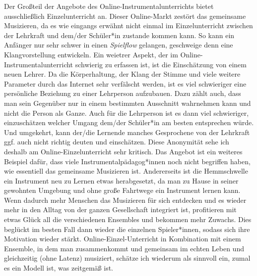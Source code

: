 Der Großteil der Angebote des Online-Instrumentalunterrichts bietet
ausschließlich Einzelunterricht an. Dieser Online-Markt zestört das gemeinsame
Musizieren, da es wie eingangs erwähnt nicht einmal im Einzelunterricht zwischen
der Lehrkraft und dem/der Schüler*in zustande kommen kann. So kann ein Anfänger
nur sehr schwer in einen \emph{Spielflow} gelangen, geschweige denn eine
Klangvorstellung entwickeln. Ein weietrer Aspekt, der im
Online-Instrumentalunterricht schwierig zu erfassen ist, ist die Einschätzung
von einem neuen Lehrer. Da die Körperhaltung, der Klang der Stimme und viele
weitere Parameter durch das Internet sehr verfälscht werden, ist es viel
schwieriger eine persönliche Beziehung zu einer Lehrperson aufzubauen. Dazu
zählt auch, dass man sein Gegenüber nur in einem bestimmten Ausschnitt
wahrnehmen kann und nicht die Person als Ganze. Auch für die Lehrperson ist es
dann viel schwieriger, einzuschätzen welcher Umgang dem/der Schüler*in am besten
entsprechen würde. Und umgekehrt, kann der/die Lernende manches Gesprochene von
der Lehrkraft ggf. auch nicht richtig deuten und einschätzen. Diese Anonymität
sehe ich deshalb am Online-Einzelunterricht sehr kritisch. Das Angebot ist ein
weiteres Beispiel dafür, dass viele Instrumentalpädagog*innen noch nicht
begriffen haben, wie essentiell das gemeinsame Musizieren ist. Andererseits ist
die Hemmschwelle ein Instrument neu zu Lernen etwas herabgesetzt, da man zu
Hause in seiner gewohnten Umgebung und ohne große Fahrtwege ein Instrument
lernen kann. Wenn dadurch mehr Menschen das Musizieren für sich entdecken und es
wieder mehr in den Alltag von der ganzen Gesellschaft integriert ist,
profitieren mit etwas Glück all die verschiedenen Ensembles und bekommen mehr
Zuwachs. Dies beglückt im besten Fall dann wieder die einzelnen Spieler*innen,
sodass sich ihre Motivation wieder stärkt. Online-Einzel-Unterricht in
Kombination mit einem Ensemble, in dem man zusammenkommt und gemeinsam im echten
Leben und gleichzeitig (ohne Latenz) musiziert, schätze ich wiederum als
sinnvoll ein, zumal es ein Modell ist, was zeitgemäß ist. 

